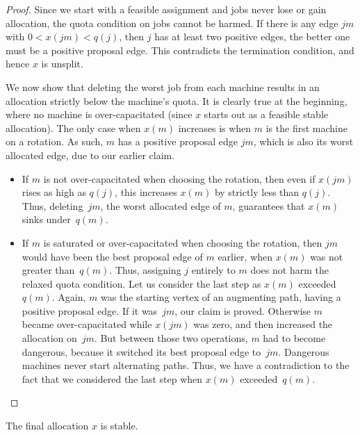 \documentclass{llncs}
\begin{document}
\begin{proof} 
Since we start with a feasible assignment and jobs never lose or gain
allocation, the quota condition on jobs cannot be harmed. If there is
any edge $jm$ with $0 < x(jm) < q(j)$, then $j$ has at least two
positive edges, the better one must be a positive proposal edge. This
contradicts the termination condition, and hence $x$ is unsplit.
	
We now show that deleting the worst job from each machine results in
an allocation strictly below the machine's quota. It is clearly true
at the beginning, where no machine is over-capacitated (since $x$
starts out as a feasible stable allocation). The only case when $x(m)$
increases is when $m$ is the first machine on a rotation. As such, $m$
has a positive proposal edge $jm$, which is also its worst allocated
edge, due to our earlier claim.  
\begin{itemize}
\item If $m$ is not over-capacitated when choosing the
  rotation, then even if $x(jm)$ rises as high as $q(j)$, this
  increases $x(m)$ by strictly less than $q(j)$. Thus, deleting~$jm$,
  the worst allocated edge of $m$, guarantees that $x(m)$ sinks
  under~$q(m)$.
\item If $m$ is saturated or over-capacitated when choosing the
  rotation, then $jm$ would have been the best proposal edge of $m$
  earlier, when $x(m)$ was not greater than~$q(m)$. Thus, assigning
  $j$ entirely to $m$ does not harm the relaxed quota condition. Let
  us consider the last step as $x(m)$ exceeded~$q(m)$. Again, $m$ was
  the starting vertex of an augmenting path, having a positive
  proposal edge. If it was~$jm$, our claim is proved. Otherwise $m$
  became over-capacitated while $x(jm)$ was zero, and then increased
  the allocation on~$jm$. But between those two operations, $m$
  had to become dangerous, because it switched its best proposal edge
  to~$jm$. Dangerous machines never start alternating paths. Thus, we
  have a contradiction to the fact that we considered the last step
  when $x(m)$ exceeded~$q(m)$.
\end{itemize}\end{proof}

\begin{claim}
The final allocation $x$ is stable.
\end{claim}
\end{document}
